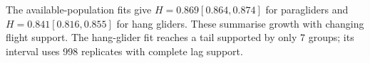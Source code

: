 The available-population fits give $H=0.869 [0.864, 0.874]$ for paragliders and $H=0.841 [0.816, 0.855]$ for hang gliders. These summarise growth with changing flight support. The hang-glider fit reaches a tail supported by only 7 groups; its interval uses 998 replicates with complete lag support.
